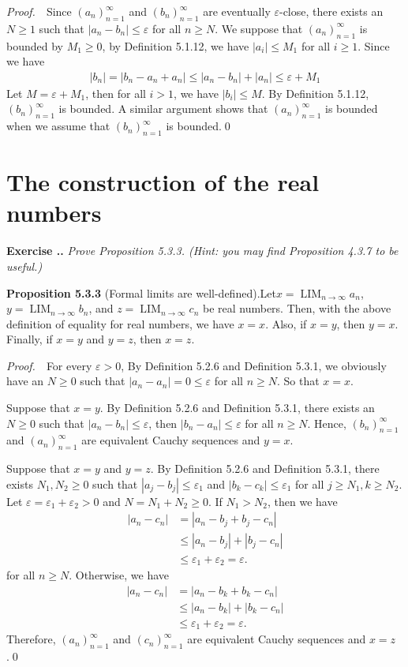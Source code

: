 \documentclass{book}
\DeclareMathOperator{\tlim}{LIM}%
\newcommand{\pff}{\vspace{.25em}\noindent\emph{Proof.}~~}
\newcommand{\titl}[1]{\noindent\textbf{#1}}
\newcounter{Exercise}[section]
\renewcommand{\theExercise}{\thesection.\arabic{Exercise}.}
\newcommand{\new}{\vspace{1.5em}\noindent\textbf{{Exercise \stepcounter{Exercise}\textbf{\theExercise}}} }
\begin{document}
\pff Since $(a_n)^\infty_{n=1}$ and $(b_n)^\infty_{n=1}$ are eventually $\varepsilon$-close, there exists an $N\geq 1$ such that $|a_n-b_n|\leq\varepsilon$ for all $n\geq N$. We suppose that $(a_n)_{n=1}^\infty$ is bounded by $M_1\geq 0$, by Definition 5.1.12, we have $|a_i|\leq M_1$ for all $i\geq 1$. Since we have
    \begin{align*}
        |b_n|=|b_n-a_n+a_n|\leq|a_n-b_n|+|a_n|\leq\varepsilon+M_1
    \end{align*}
Let $M=\varepsilon+M_1$, then for all $i>1$, we have $|b_i|\leq M$. By Definition 5.1.12, $(b_n)_{n=1}^\infty$ is bounded. A similar argument shows that $(a_n)_{n=1}^\infty$ is bounded when we assume that $(b_n)_{n=1}^\infty$ is bounded.\qed

\section{The construction of the real numbers}

\new\emph{Prove Proposition 5.3.3. (Hint: you may find Proposition 4.3.7 to be useful.)}
\newpage
\begin{framed}
\titl{Proposition 5.3.3} (Formal limits are well-defined).\qquad Let\quad $x =\tlim_{n\to\infty}a_n$, $y=\tlim_{n\to\infty}b_n$, and $z=\tlim_{n\to\infty}c_n$ be real numbers. Then, with the above definition of equality for real numbers, we have $x=x$. Also, if $x=y$, then $y=x$. Finally, if $x=y$ and $y=z$, then $x=z$.
\end{framed}

\pff For every $\varepsilon>0$, By Definition 5.2.6 and Definition 5.3.1, we obviously have an $N\geq 0$ such that $|a_n-a_n|=0\leq\varepsilon$ for all $n\geq N$. So that $x=x$.

Suppose that $x=y$. By Definition 5.2.6 and Definition 5.3.1, there exists an $N\geq 0$ such that $|a_n-b_n|\leq\varepsilon$, then $|b_n-a_n|\leq\varepsilon$ for all $n\geq N$. Hence, $(b_n)_{n=1}^\infty$ and $(a_n)_{n=1}^\infty$ are equivalent Cauchy sequences and $y=x$.

Suppose that $x=y$ and $y=z$. By Definition 5.2.6 and Definition 5.3.1, there exists $N_1,N_2\geq 0$ such that $|a_{j}-b_{j}|\leq\varepsilon_1$ and $|b_{k}-c_{k}|\leq\varepsilon_1$ for all $j\geq N_1,k\geq N_2$. Let $\varepsilon=\varepsilon_1+\varepsilon_2>0$ and $N=N_1+N_2\geq 0$. If $N_1>N_2$, then we have
    \begin{align*}
        |a_n-c_n|&=|a_n-b_{j}+b_{j}-c_n|\\
        &\leq|a_n-b_{j}|+|b_{j}-c_n|\\
        &\leq\varepsilon_1+\varepsilon_2=\varepsilon.
    \end{align*}
for all $n\geq N$. Otherwise, we have
    \begin{align*}
        |a_n-c_n|&=|a_n-b_{k}+b_{k}-c_n|\\
        &\leq|a_n-b_{k}|+|b_{k}-c_n|\\
        &\leq\varepsilon_1+\varepsilon_2=\varepsilon.
    \end{align*}
Therefore, $(a_n)_{n=1}^\infty$ and $(c_n)_{n=1}^\infty$ are equivalent Cauchy sequences and $x=z$.\qed
\end{document}
